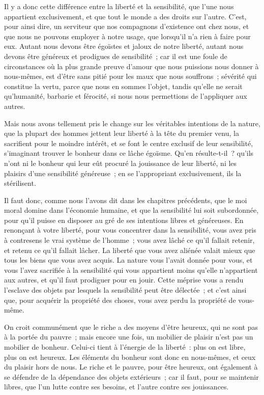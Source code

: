 \documentclass[french,twoside]{book} %
\begin{document}
Il y a donc cette différence entre la liberté et la sensibilité, que l’une nous appartient exclusivement, et que tout le monde a des droits sur l’autre. C’est, pour ainsi dire, un serviteur que nos compagnons d’existence ont chez nous, et que nous ne pouvons employer à notre usage, que lorsqu’il n’a rien à faire pour eux. Autant nous devons être égoïstes et jaloux de notre liberté, autant nous devons être généreux et prodigues de sensibilité ; car il est une foule de circonstances où la plus grande preuve d’amour que nous puissions nous donner à nous-mêmes, est d’être sans pitié pour les maux que nous souffrons ; sévérité qui constitue la vertu, parce que nous en sommes l’objet, tandis qu’elle ne serait qu’humanité, barbarie et férocité, si nous nous permettions de l’appliquer aux autres.\par
Mais nous avons tellement pris le change sur les véritables intentions de la nature, que la plupart des hommes jettent leur liberté à la tête du premier venu, la sacrifient pour le moindre intérêt, et se font le centre exclusif de leur sensibilité, s’imaginant trouver le bonheur dans ce lâche égoïsme. Qu’en résulte-t-il ? qu’ils n’ont ni le bonheur qui leur eût procuré la jouissance de leur liberté, ni les plaisirs d’une sensibilité généreuse ; en se l’appropriant exclusivement, ils la stérilisent.\par
Il faut donc, comme nous l’avons dit dans les chapitres précédents, que le moi moral domine dans l’économie humaine, et que la sensibilité lui soit subordonnée, pour qu’il puisse en disposer au gré de ses intentions libres et généreuses. En renonçant à votre liberté, pour vous concentrer dans la sensibilité, vous avez pris à contresens le vrai système de l’homme ; vous avez lâché ce qu’il fallait retenir, et retenu ce qu’il fallait lâcher. La liberté que vous avez aliénée valait mieux que tous les biens que vous avez acquis. La nature vous l’avait donnée pour vous, et vous l’avez sacrifiée à la sensibilité qui vous appartient moins qu’elle n’appartient aux autres, et qu’il faut prodiguer pour en jouir. Cette méprise vous a rendu l’esclave des objets par lesquels la sensibilité peut être délectée ; et c’est ainsi que, pour acquérir la propriété des choses, vous avez perdu la propriété de vous-même.\par
On croit communément que le riche a des moyens d’être heureux, qui ne sont pas à la portée du pauvre ; mais encore une fois, un mobilier de plaisir n’est pas un mobilier de bonheur. Celui-ci tient à l’énergie de la liberté : plus on est libre, plus on est heureux. Les éléments du bonheur sont donc en nous-mêmes, et ceux du plaisir hors de nous. Le riche et le pauvre, pour être heureux, ont également à se défendre de la dépendance des objets extérieurs ; car il faut, pour se maintenir libres, que l’un lutte contre ses besoins, et l’autre contre ses jouissances.\par
\end{document}
